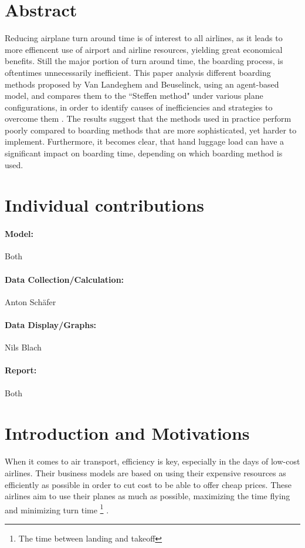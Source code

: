 \documentclass[11pt]{article}
\begin{document}
\section{Abstract}




Reducing airplane turn around time is of interest to all airlines, as it leads to more effiencent use of airport and airline resources, yielding great economical benefits.
Still the major portion of turn around time, the boarding process, is oftentimes unnecessarily inefficient.
This paper analysis different boarding methods proposed by Van Landeghem and Beuselinck, using an agent-based model, and compares them to the ``Steffen method" under various plane configurations, in order to identify causes of inefficiencies and strategies to overcome them \cite{beus} \cite{steffen}.
The results suggest that the methods used in practice perform poorly compared to boarding methods that are more sophisticated, yet harder to implement. Furthermore, it becomes clear, that hand luggage load can have a significant impact on boarding time, depending on which boarding method is used.





\section{Individual contributions}



\paragraph{Model:} Both
\paragraph{Data Collection/Calculation:} Anton Sch{\"a}fer
\paragraph{Data Display/Graphs:} Nils Blach
\paragraph{Report:} Both

\section{Introduction and Motivations}
When it comes to air transport, efficiency is key, especially in the days of low-cost airlines. Their business models are based on using their expensive resources as efficiently as possible in order to cut cost to be able to offer cheap prices. These airlines aim to use their planes as much as possible, maximizing the time flying and minimizing turn time \footnote{The time between landing and takeoff} \cite{barrett}.
\end{document}

